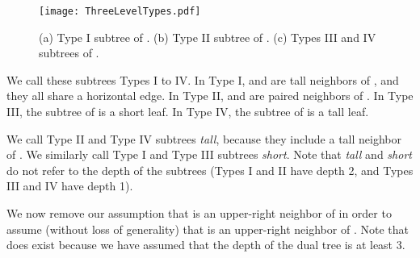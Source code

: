\documentclass{article}
\begin{document}
		\begin{figure}[htbp] 
			\begin{center}
				\texttt{[image: ThreeLevelTypes.pdf]} 
			\end{center}
			\caption{ 
				(a) Type I subtree of .
				(b) Type II subtree of . 
				(c) Types III and IV subtrees of .
			}
			\label{fig:threeleveltypes}
		\end{figure}

		We call these subtrees Types I to IV.  In Type I,  and  are tall
		neighbors of , and they all share a horizontal edge.
		In Type II,  and  are paired neighbors of .
		In Type III, the subtree of  is a short leaf.
		In Type IV, the subtree of  is a tall leaf.
		
		We call Type II and Type IV subtrees \emph{tall}, because they include a tall
		neighbor of .  We similarly call Type I and Type III subtrees
		\emph{short}.  Note that \emph{tall} and \emph{short} do not refer to the
		depth of the subtrees (Types I and II have depth 2, and Types III and IV have
		depth 1).
		
		We now remove our assumption that  is an upper-right neighbor of  in
		order to assume (without loss of generality) that  is an upper-right
		neighbor of .
		Note that  does exist because we have assumed that the depth of the dual
		tree is at least 3.
		
\end{document}
